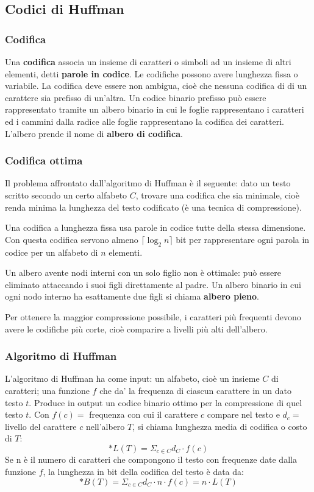 \documentclass[11pt]{article}
\begin{document}
\subsection{Codici di Huffman}
\subsubsection{Codifica}
Una \textbf{codifica} associa un insieme di caratteri o simboli ad un insieme di altri elementi, detti \textbf{parole in codice}.
Le codifiche possono avere lunghezza fissa o variabile. La codifica deve essere non ambigua, cioè che nessuna codifica di 
di un carattere sia prefisso di un'altra. Un codice binario prefisso può essere rappresentato tramite un albero binario 
in cui le foglie rappresentano i caratteri ed i cammini dalla radice alle foglie rappresentano la codifica dei caratteri. 
L'albero prende il nome di \textbf{albero di codifica}.
\subsubsection{Codifica ottima}
Il problema affrontato dall'algoritmo di Huffman è il seguente: dato un testo scritto secondo un certo alfabeto $C$, trovare 
una codifica che sia minimale, cioè renda minima la lunghezza del testo codificato (è una tecnica di compressione). 

Una codifica a lunghezza fissa usa parole in codice tutte della stessa dimensione. Con questa codifica servono almeno 
$\lceil \log_2 n\rceil$ bit per rappresentare ogni parola in codice per un alfabeto di $n$ elementi.

Un albero avente nodi interni con un solo figlio non è ottimale: può essere eliminato attaccando i suoi figli direttamente 
al padre. Un albero binario in cui ogni nodo interno ha esattamente due figli si chiama \textbf{albero pieno}.

Per ottenere la maggior compressione possibile, i caratteri più frequenti devono avere le codifiche più corte, cioè comparire 
a livelli più alti dell'albero.
\subsubsection{Algoritmo di Huffman}
L'algoritmo di Huffman ha come input: un alfabeto, cioè un insieme $C$ di caratteri; una funzione $f$ che da' la frequenza 
di ciascun carattere in un dato testo $t$.
Produce in output un codice binario ottimo per la compressione di quel testo $t$.
Con $f(c)=$ frequenza con cui il carattere $c$ compare nel testo e $d_c=$ livello del carattere $c$ nell'albero $T$, si 
chiama lunghezza media di codifica o costo di $T$:
\begin{equation}*
    L(T)=\Sigma_{c\in C}d_C\cdot f(c)
\end{equation}
Se n è il numero di caratteri che compongono il testo con frequenze date dalla funzione $f$, la lunghezza in bit della 
codifica del testo è data da:
\begin{equation}*
    B(T)=\Sigma_{c\in C}d_C\cdot n\cdot f(c)=n\cdot L(T)
\end{equation}
\end{document}

